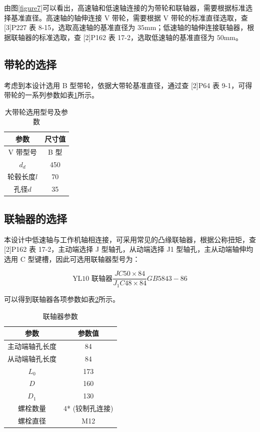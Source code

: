\documentclass[12pt]{ctexart}
\begin{document}
由图\ref{figure7}可以看出，高速轴和低速轴连接的为带轮和联轴器，需要根据标准选择基准直径。高速轴的轴伸连接 V 带轮，需要根据 V 带轮的标准直径选取，查 [3]P227 表 8-15，选取高速轴的基准直径为 $35\text{mm}$；低速轴的轴伸连接联轴器，根据联轴器的标准选取，查 [2]P162 表 17-2，选取低速轴的基准直径为 $50\text{mm}$。

\subsection{带轮的选择}

考虑到本设计选用 B 型带轮，依据大带轮基准直径，通过查 [2]P64 表 9-1，可得带轮的一系列参数如表\ref{table14}所示。

\begin{table}[htbp]
    \centering
    \begin{tabular}{c c}
        \toprule
        参数 & 尺寸值 \\
        \midrule
        V 带型号         & B 型 \\
        $d_d$           & 450 \\
        轮毂长度$l$     & 70 \\
        孔径$d$         & 35 \\
        \bottomrule
    \end{tabular}
    \caption{大带轮选用型号及参数}
    \label{table14}
\end{table}

\subsection{联轴器的选择}

本设计中低速轴与工作机轴相连接，可采用常见的凸缘联轴器，根据公称扭矩，查 [2]P162 表 17-2，主动端选择 J 型轴孔，从动端选择 J1 型轴孔，主从动端轴伸均选用 C 型键槽，因此可选用联轴器型号为：

$$ \text{YL10 联轴器} \frac{JC50\times 84}{J_1C48\times 84}GB5843-86 $$ 

可以得到联轴器各项参数如表\ref{table15}所示。

\begin{table}[htbp]
    \centering
    \begin{tabular}{c c}
        \toprule
        参数 & 参数值 \\
        \midrule
        主动端轴孔长度   & 84 \\
        从动端轴孔长度   & 84 \\
        $L_0$           & 173 \\
        $D$             & 160 \\
        $D_1$          & 130 \\
        螺栓数量        & 4* (铰制孔连接)\\
        螺栓直径        & M12\\
        \bottomrule
    \end{tabular}
    \caption{联轴器参数}
    \label{table15}
\end{table}
\end{document}
